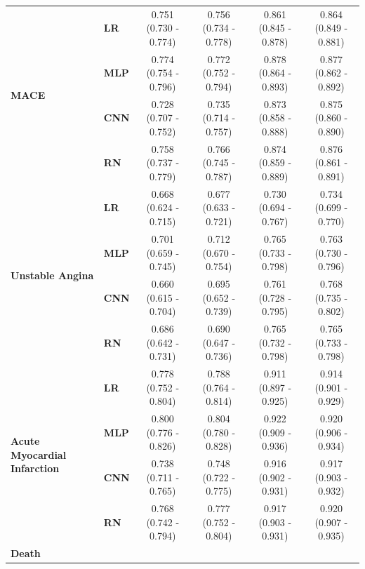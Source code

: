 \documentclass[preprint]{elsarticle}
\begin{document}
\begin{table}[H]
\begin{adjustbox}{center}
\begin{tabular}{@{}llcccc@{}}
\multirow{4}{*}{\begin{minipage}{0.65in}\textbf{MACE}\end{minipage}} %
& \textbf{LR} & 0.751 (0.730 - 0.774) & 0.756 (0.734 - 0.778) & 0.861 (0.845 - 0.878) & 0.864 (0.849 - 0.881) \\
& \textbf{MLP} & 0.774 (0.754 - 0.796) & 0.772 (0.752 - 0.794) & 0.878 (0.864 - 0.893) & 0.877 (0.862 - 0.892) \\
& \textbf{CNN} & 0.728 (0.707 - 0.752) & 0.735 (0.714 - 0.757) & 0.873 (0.858 - 0.888) & 0.875 (0.860 - 0.890) \\
& \textbf{RN} & 0.758 (0.737 - 0.779) & 0.766 (0.745 - 0.787) & 0.874 (0.859 - 0.889) & 0.876 (0.861 - 0.891) \\
  \cmidrule(lr){1-2}
\multirow{4}{*}{\begin{minipage}{0.65in}\textbf{Unstable Angina}\end{minipage}} %
& \textbf{LR} & 0.668 (0.624 - 0.715) & 0.677 (0.633 - 0.721) & 0.730 (0.694 - 0.767) & 0.734 (0.699 - 0.770) \\
& \textbf{MLP} & 0.701 (0.659 - 0.745) & 0.712 (0.670 - 0.754) & 0.765 (0.733 - 0.798) & 0.763 (0.730 - 0.796) \\
& \textbf{CNN} & 0.660 (0.615 - 0.704) & 0.695 (0.652 - 0.739) & 0.761 (0.728 - 0.795) & 0.768 (0.735 - 0.802) \\
& \textbf{RN} & 0.686 (0.642 - 0.731) & 0.690 (0.647 - 0.736) & 0.765 (0.732 - 0.798) & 0.765 (0.733 - 0.798) \\
  \cmidrule(lr){1-2}
\multirow{4}{*}{\begin{minipage}{0.65in}\textbf{Acute \linebreak Myocardial \linebreak Infarction}\end{minipage}} %
& \textbf{LR} & 0.778 (0.752 - 0.804) & 0.788 (0.764 - 0.814) & 0.911 (0.897 - 0.925) & 0.914 (0.901 - 0.929) \\
& \textbf{MLP} & 0.800 (0.776 - 0.826) & 0.804 (0.780 - 0.828) & 0.922 (0.909 - 0.936) & 0.920 (0.906 - 0.934) \\
& \textbf{CNN} & 0.738 (0.711 - 0.765) & 0.748 (0.722 - 0.775) & 0.916 (0.902 - 0.931) & 0.917 (0.903 - 0.932) \\
& \textbf{RN} & 0.768 (0.742 - 0.794) & 0.777 (0.752 - 0.804) & 0.917 (0.903 - 0.931) & 0.920 (0.907 - 0.935) \\
  \cmidrule(lr){1-2}
\multirow{4}{*}{\begin{minipage}{0.65in}\textbf{Death}\end{minipage}} %

\end{tabular}
\end{adjustbox}
\end{table}
\end{document}

